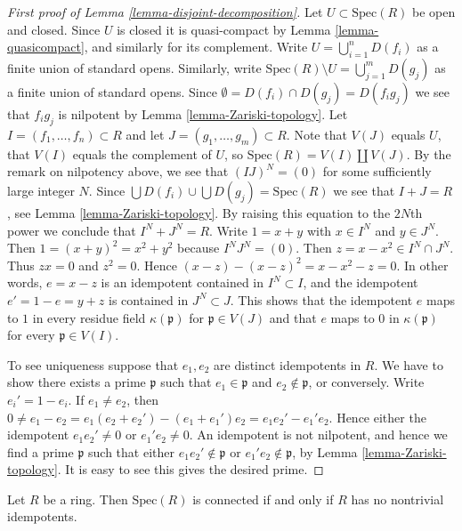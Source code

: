 \begin{proof}[First proof of Lemma \ref{lemma-disjoint-decomposition}]
Let $U \subset \text{Spec}(R)$ be open and closed.
Since $U$ is closed it is quasi-compact by
Lemma \ref{lemma-quasicompact}, and similarly for
its complement.
Write $U = \bigcup_{i=1}^n D(f_i)$ as a finite union of standard opens.
Similarly, write $\text{Spec}(R) \setminus U = \bigcup_{j=1}^m D(g_j)$
as a finite union of standard opens. Since $\emptyset =
D(f_i) \cap D(g_j) = D(f_i g_j)$ we see that $f_i g_j$ is
nilpotent by Lemma \ref{lemma-Zariski-topology}.
Let $I = (f_1, \ldots, f_n) \subset R$ and let
$J = (g_1, \ldots, g_m) \subset R$.
Note that $V(J)$ equals $U$, that $V(I)$
equals the complement of $U$, so $\text{Spec}(R) = V(I) \coprod V(J)$.
By the remark on nilpotency above,
we see that $(IJ)^N = (0)$ for some sufficiently large integer $N$.
Since $\bigcup D(f_i) \cup \bigcup D(g_j) = \text{Spec}(R)$
we see that $I + J = R$, see Lemma \ref{lemma-Zariski-topology}.
By raising this equation to the $2N$th power we conclude that
$I^N + J^N = R$. Write $1 = x + y$ with $x \in I^N$ and $y \in J^N$.
Then $1 = (x + y)^2 = x^2 + y^2$ because $I^N J^N = (0)$.
Then $z = x - x^2 \in I^N \cap J^N$. Thus $zx = 0$ and $z^2 = 0$.
Hence $(x - z) - (x - z)^2 = x - x^2 - z = 0$.
In other words, $e = x - z$ is an idempotent contained in
$I^N \subset I$, and the idempotent $e' = 1 - e = y + z$
is contained in $J^N \subset J$. This shows that the
idempotent $e$ maps to $1$ in every residue field
$\kappa(\mathfrak p)$ for $\mathfrak p \in V(J)$ and
that $e$ maps to $0$ in $\kappa(\mathfrak p)$
for every $\mathfrak p \in V(I)$.

\medskip\noindent
To see uniqueness suppose that $e_1, e_2$ are
distinct idempotents in $R$. We have to show there
exists a prime $\mathfrak p$ such that $e_1 \in \mathfrak p$
and $e_2 \not \in \mathfrak p$, or conversely.
Write $e_i' = 1 - e_i$. If $e_1 \not = e_2$, then
$0 \not = e_1 - e_2  = e_1(e_2 + e_2') - (e_1 + e_1')e_2
= e_1 e_2' - e_1' e_2$. Hence either the idempotent
$e_1 e_2' \not = 0$ or $e_1' e_2 \not = 0$. An idempotent
is not nilpotent, and hence we find a prime 
$\mathfrak p$ such that either $e_1e_2' \not \in \mathfrak p$
or $e_1'e_2 \not \in \mathfrak p$, by Lemma \ref{lemma-Zariski-topology}.
It is easy to see this gives the desired prime.
\end{proof}

\begin{lemma}
\label{lemma-characterize-spec-connected}
Let $R$ be a ring. Then $\text{Spec}(R)$ is
connected if and only if $R$ has no nontrivial
idempotents.
\end{lemma}

